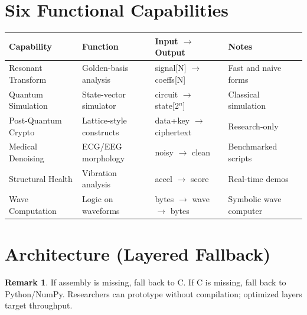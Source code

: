 \documentclass[11pt, a4paper, openany]{book}
\theoremstyle{definition}
\newtheorem{remark}{Remark}[chapter]
\begin{document}
\section{Six Functional Capabilities}
\begin{table}[h]
\centering
\begin{tabular}{@{}llll@{}}\toprule
Capability & Function & Input $\to$ Output & Notes \\ \midrule
Resonant Transform & Golden-basis analysis & signal[N] $\to$ coeffs[N] & Fast and naive forms \\
Quantum Simulation & State-vector simulator & circuit $\to$ state[2$^n$] & Classical simulation \\
Post-Quantum Crypto & Lattice-style constructs & data+key $\to$ ciphertext & Research-only \\
Medical Denoising & ECG/EEG morphology & noisy $\to$ clean & Benchmarked scripts \\
Structural Health & Vibration analysis & accel $\to$ score & Real-time demos \\
Wave Computation & Logic on waveforms & bytes $\to$ wave $\to$ bytes & Symbolic wave computer \\ \bottomrule
\end{tabular}
\end{table}

\section{Architecture (Layered Fallback)}
\begin{center}
\end{center}

\begin{remark}
If assembly is missing, fall back to C. If C is missing, fall back to Python/NumPy. Researchers can prototype without compilation; optimized layers target throughput.
\end{remark}
\end{document}
